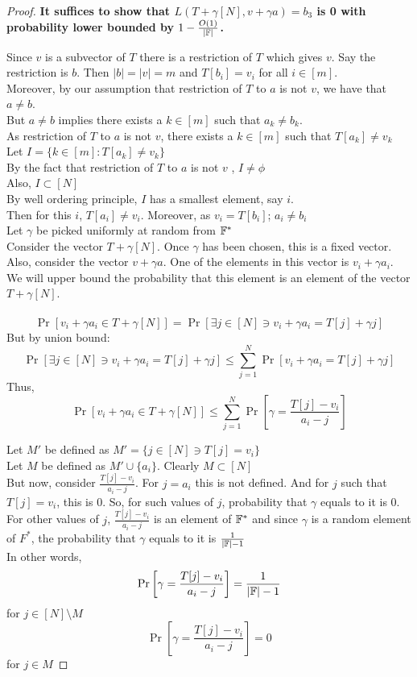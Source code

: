 \begin{proof}
    \textbf{It suffices to show that $L(T+\gamma[N], v+\gamma a)=b_3$ is 0 with probability lower bounded by $1-\frac{O(1)}{|\mathbb{F}|}$.}

    Since $v$ is a subvector of $T$ there is a restriction of $T$ which gives $v$. Say the restriction is $b$. Then $|b|=|v|=m$ and $T[b_i]=v_i$ for all $i \in [m]$. \\
    Moreover, by our assumption that restriction of $T$ to $a$ is not $v$, we have that $a \neq b$. \\
    But $a\neq b$ implies there exists a $k \in [m]$ such that $a_k\neq b_k$.\\
    As restriction of $T$ to $a$ is not $v$, there exists a $k \in [m]$ such that $T[a_k]\neq v_k$\\
    Let $I=\{k \in [m]: T[a_k]\neq v_k\}$\\
    By the fact that restriction of $T$ to $a$ is not $v$ , $I \neq \phi$\\
    Also, $I \subset [N]$\\
    By well ordering principle, $I$ has a smallest element, say $i$.\\
    Then for this $i$, $T[a_i]\neq v_i$. Moreover, as $v_i=T[b_i]$; $a_i \neq b_i$ \\
    Let $\gamma$ be picked uniformly at random from $\mathbb{F}^*$\\
    Consider the vector $T+\gamma[N]$. Once $\gamma$ has been chosen, this is a fixed vector. \\
    Also, consider the vector $v+\gamma a$. One of the elements in this vector is $v_i +\gamma a_i$.\\
    We will upper bound the probability that this element is an element of the vector $T+\gamma[N]$. \\\\
    $$\Pr[v_i +\gamma a_i \in T+\gamma[N]]=\Pr[\exists j \in [N] \ni v_i +\gamma a_i=T[j]+\gamma j]$$
    But by union bound:
    $$\Pr[\exists j \in [N] \ni v_i +\gamma a_i=T[j]+\gamma j] \leq \sum_{j=1}^N \Pr[v_i +\gamma a_i=T[j]+\gamma j]$$
    Thus,
    $$\Pr[v_i +\gamma a_i \in T+\gamma[N]] \leq \sum_{j=1}^N \Pr\left[\gamma = \frac{T[j]-v_i}{a_i-j}\right] $$

    Let $M'$ be defined as $M'=\{j\in [N] \ni T[j]=v_i \}$ \\
    Let $M$ be defined as $M' \cup \{a_i\}$. Clearly $M \subset [N]$\\
    But now, consider $\frac{T[j]-v_i}{a_i-j}$. For $j=a_i$ this is not defined. And for $j$ such that $T[j]=v_i$, this is 0. So, for such values of $j$, probability that $\gamma$ equals to it is $0$.\\
    For other values of $j$, $\frac{T[j]-v_i}{a_i-j}$ is an element of $\mathbb{F}^{*}$ and since $\gamma$ is a random element of $F^{*}$, the probability that $\gamma$ equals to it is $\frac{1}{|\mathbb{F}|-1}$\\
    In other words,
    $$\Pr\left[\gamma = \frac{T[j]-v_i}{a_i-j}\right]=\frac{1}{|\mathbb{F}|-1}$$ for $j \in [N]\setminus M$
    $$\Pr\left[\gamma = \frac{T[j]-v_i}{a_i-j}\right]=0$$ for $j \in M$


\end{proof}
